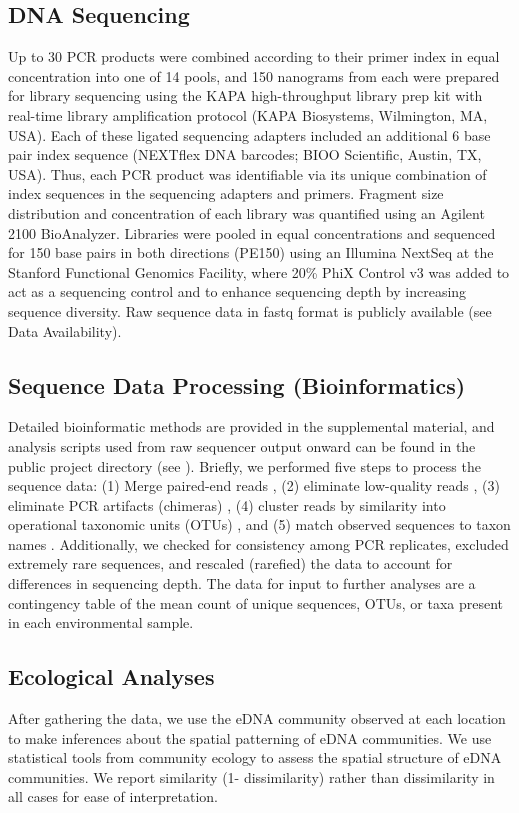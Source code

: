 \documentclass[11pt,letterpaper]{article} %
\begin{document}
\subsection*{DNA Sequencing}
Up to 30 PCR products were combined according to their primer index in equal concentration into one of 14 pools, and 150 nanograms from each were prepared for library sequencing using the KAPA high-throughput library prep kit with real-time library amplification protocol (KAPA Biosystems, Wilmington, MA, USA). Each of these ligated sequencing adapters included an additional 6 base pair index sequence (NEXTflex DNA barcodes; BIOO Scientific, Austin, TX, USA). Thus, each PCR product was identifiable via its unique combination of index sequences in the sequencing adapters and primers. Fragment size distribution and concentration of each library was quantified using an Agilent 2100 BioAnalyzer. Libraries were pooled in equal concentrations and sequenced for 150 base pairs in both directions (PE150) using an Illumina NextSeq at the Stanford Functional Genomics Facility, where 20\% PhiX Control v3 was added to act as a sequencing control and to enhance sequencing depth by increasing sequence diversity. Raw sequence data in fastq format is publicly available (see Data Availability).


\subsection*{Sequence Data Processing (Bioinformatics)}
Detailed bioinformatic methods are provided in the supplemental material, and analysis scripts used from raw sequencer output onward can be found in the public project directory (see ). Briefly, we performed five steps to process the sequence data: (1) Merge paired-end reads \citep{Zhang2014}, (2) eliminate low-quality reads \citep{Edgar2010,vsearch}, (3) eliminate PCR artifacts (chimeras) \citep{Edgar2010,vsearch,Martin2011}, (4) cluster reads by similarity into operational taxonomic units (OTUs) \citep{swarm}, and (5) match observed sequences to taxon names \citep{Camacho2009, Chamberlain2013, Chamberlain2016}. Additionally, we checked for consistency among PCR replicates, excluded extremely rare sequences, and rescaled (rarefied) the data to account for differences in sequencing depth. The data for input to further analyses are a contingency table of the mean count of unique sequences, OTUs, or taxa present in each environmental sample.


\subsection*{Ecological Analyses}
After gathering the data, we use the eDNA community observed at each location to make inferences about the spatial patterning of eDNA communities. We use statistical tools from community ecology to assess the spatial structure of eDNA communities. We report similarity (1- dissimilarity) rather than dissimilarity in all cases for ease of interpretation.
\end{document}
